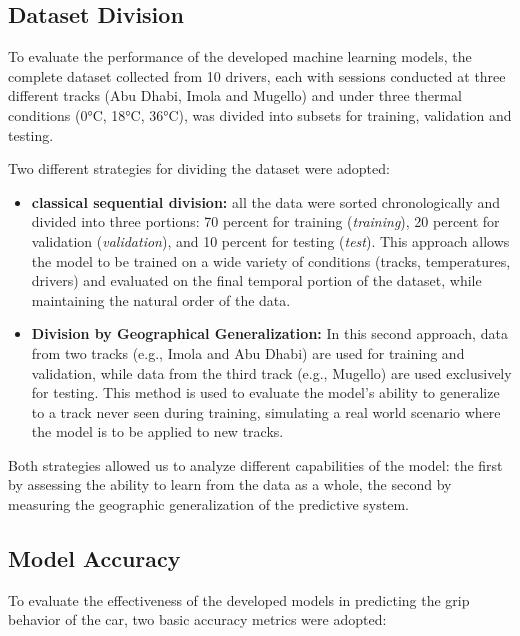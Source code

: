 \documentclass[a4paper,final,12pt]{report}
\begin{document}
\subsection{Dataset Division}
To evaluate the performance of the developed machine learning models, the complete dataset collected from 10 drivers, each with sessions conducted at three different tracks (Abu Dhabi, Imola and Mugello) and under three thermal conditions (0°C, 18°C, 36°C), was divided into subsets for training, validation and testing.

Two different strategies for dividing the dataset were adopted:
\begin{itemize}
    \item \textbf{classical sequential division:} all the data were sorted chronologically and divided into three portions: 70 percent for training (\textit{training}), 20 percent for validation (\textit{validation}), and 10 percent for testing (\textit{test}). This approach allows the model to be trained on a wide variety of conditions (tracks, temperatures, drivers) and evaluated on the final temporal portion of the dataset, while maintaining the natural order of the data.

    \item \textbf{Division by Geographical Generalization:} In this second approach, data from two tracks (e.g., Imola and Abu Dhabi) are used for training and validation, while data from the third track (e.g., Mugello) are used exclusively for testing. This method is used to evaluate the model's ability to generalize to a track never seen during training, simulating a real world scenario where the model is to be applied to new tracks.

\end{itemize}
Both strategies allowed us to analyze different capabilities of the model: the first by assessing the ability to learn from the data as a whole, the second by measuring the geographic generalization of the predictive system.

\subsection{Model Accuracy}
To evaluate the effectiveness of the developed models in predicting the grip behavior of the car, two basic accuracy metrics were adopted:
\end{document}
